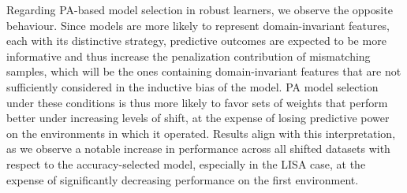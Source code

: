 Regarding PA-based model selection in robust learners, we observe the opposite behaviour. Since models are more likely
to represent domain-invariant features, each with its distinctive strategy, predictive outcomes are expected to
be more informative and thus increase the penalization contribution of mismatching samples, which will be the ones
containing domain-invariant features that are not sufficiently considered in the inductive bias of the model. PA
model selection under these conditions is thus more likely to favor sets of weights that perform better under
increasing levels of shift, at the expense of losing predictive power on the environments in which it operated. 
Results align with this interpretation, as we observe a notable increase in performance across all shifted datasets
with respect to the accuracy-selected model, especially in the LISA case, at the expense of significantly decreasing
performance on the first environment.\\


